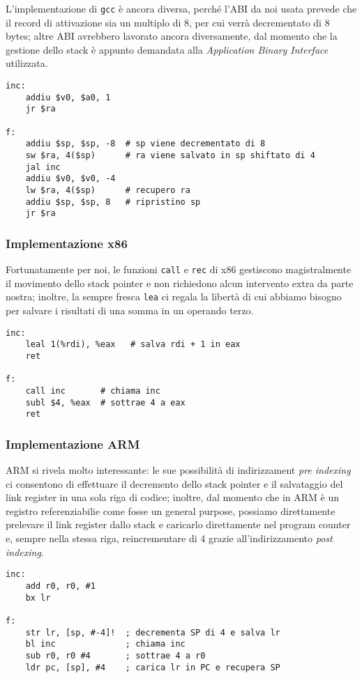 \documentclass[class=book, crop=false, oneside]{standalone}
\begin{document}
L'implementazione di \texttt{gcc} è ancora diversa, perché l'ABI da noi usata prevede che il record di attivazione sia un multiplo di 8, per cui  verrà decrementato di 8 bytes; altre ABI avrebbero lavorato ancora diversamente, dal momento che la gestione dello stack è appunto demandata alla \emph{Application Binary Interface} utilizzata.
\begin{verbatim}
inc:
	addiu $v0, $a0, 1
	jr $ra

f:
	addiu $sp, $sp, -8  # sp viene decrementato di 8
	sw $ra, 4($sp)      # ra viene salvato in sp shiftato di 4
	jal inc
	addiu $v0, $v0, -4
	lw $ra, 4($sp)      # recupero ra
	addiu $sp, $sp, 8   # ripristino sp
	jr $ra
\end{verbatim}

\subsubsection{Implementazione x86}
Fortunatamente per noi, le funzioni \texttt{call} e \texttt{rec} di x86 gestiscono magistralmente il movimento dello stack pointer e non richiedono alcun intervento extra da parte nostra; inoltre, la sempre fresca \texttt{lea} ci regala la libertà di cui abbiamo bisogno per salvare i risultati di una somma in un operando terzo.
\begin{verbatim}
inc:
	leal 1(%rdi), %eax	 # salva rdi + 1 in eax
	ret

f:
	call inc       # chiama inc
	subl $4, %eax  # sottrae 4 a eax
	ret
\end{verbatim}

\subsubsection{Implementazione ARM}
ARM si rivela molto interessante: le sue possibilità di indirizzament \emph{pre indexing} ci consentono di effettuare il decremento dello stack pointer e il salvataggio del link register in una sola riga di codice; inoltre, dal momento che in ARM  è un registro referenziabilie come fosse un general purpose, possiamo direttamente prelevare il link register dallo stack e caricarlo direttamente nel program counter e, sempre nella stessa riga, reincrementare  di 4 grazie all'indirizzamento \emph{post indexing}.
\begin{verbatim}
inc:
	add r0, r0, #1
	bx lr

f:
	str lr, [sp, #-4]!  ; decrementa SP di 4 e salva lr
	bl inc              ; chiama inc
	sub r0, r0 #4       ; sottrae 4 a r0
	ldr pc, [sp], #4    ; carica lr in PC e recupera SP
\end{verbatim}
\end{document}
